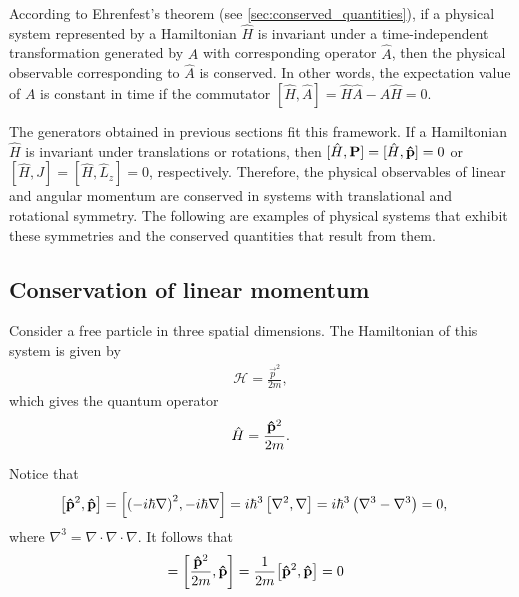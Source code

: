 According to Ehrenfest's theorem (see \cref{sec:conserved_quantities}), if a physical system represented by a Hamiltonian $\hat{H}$ is invariant under a time-independent transformation generated by $A$ with corresponding operator $\hat{A}$, then the physical observable corresponding to $\hat{A}$ is conserved. In other words, the expectation value of $A$ is constant in time if the commutator $[\hat{H},\hat{A}] = \hat{H}\hat{A} - \hat{A}\hat{H} = 0$.

The generators obtained in previous sections fit this framework. If a Hamiltonian $\hat{H}$ is invariant under translations or rotations, then $[\hat{H}, \mathbf{P}] = [\hat{H},\mathbf{\hat{p}}] = 0$ or $[\hat{H}, J] = [\hat{H}, \hat{L}_z] = 0$, respectively. Therefore, the physical observables of linear and angular momentum are conserved in systems with translational and rotational symmetry. The following are examples of physical systems that exhibit these symmetries and the conserved quantities that result from them.

\subsection{Conservation of linear momentum}
Consider a free particle in three spatial dimensions. The Hamiltonian of this system is given by
\begin{align}
    \mathcal{H} = \frac{\vec{p}^2}{2m},
\end{align}
which gives the quantum operator
\begin{align}
    \hat{H} = \frac{\mathbf{\hat{p}}^2}{2m}.
\end{align}

Notice that
\begin{align}
    \left[ \mathbf{\hat{p}}^2, \mathbf{\hat{p}} \right] &= \left[ {\left( -i\hbar \nabla \right)}^2, -i\hbar \nabla \right] = i\hbar^3 \left[ \nabla^2, \nabla \right] = i\hbar^3 \left( \nabla^3 - \nabla^3 \right) = 0,
\end{align}
where $\nabla^3 = \nabla\cdot\nabla\cdot\nabla$.
It follows that
\begin{align}
    [\hat{H},\vh{p}]
        &= \left[\frac{\vh{p}^2}{2m},\vh{p}\right] = \frac{1}{2m}{\left[\vh{p}^2,\vh{p}\right]} = 0
\end{align}


